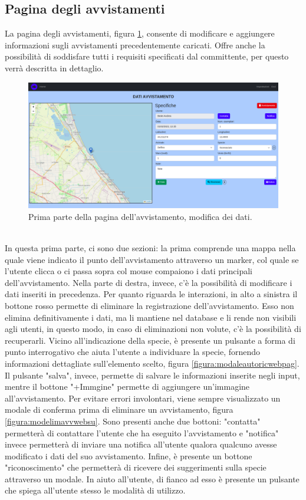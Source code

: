 \documentclass[a4paper,final,12pt]{report}
\begin{document}
\subsection{Pagina degli avvistamenti}
La pagina degli avvistamenti, figura \ref{figura:pagavvstprimaparte}, consente di modificare e aggiungere informazioni sugli avvistamenti precedentemente caricati. Offre anche la possibilità di soddisfare tutti i requisiti specificati dal committente, per questo verrà descritta in dettaglio.
\begin{figure}[hbtp]
\centering
\includegraphics[scale=0.22]{img_concettuale/avvistamentoPAG.png}
\caption{Prima parte della pagina dell'avvistamento, modifica dei dati.}
\label{figura:pagavvstprimaparte}
\end{figure}
\\In questa prima parte, ci sono due sezioni: la prima comprende una mappa nella quale viene indicato il punto dell'avvistamento attraverso un marker, col quale se l'utente clicca o ci passa sopra col mouse compaiono i dati principali dell'avvistamento. Nella parte di destra, invece, c'è la possibilità di modificare i dati inseriti in precedenza.
Per quanto riguarda le interazioni, in alto a sinistra il bottone rosso permette di eliminare la registrazione dell'avvistamento. Esso non elimina definitivamente i dati, ma li mantiene nel database e li rende non visibili agli utenti, in questo modo, in caso di eliminazioni non volute, c'è la possibilità di recuperarli.
Vicino all'indicazione della specie, è presente un pulsante a forma di punto interrogativo che aiuta l'utente a individuare la specie, fornendo informazioni dettagliate sull'elemento scelto, figura \ref{figura:modaleautoricwebpag}.  
Il pulsante "salva", invece, permette di salvare le informazioni inserite negli input, mentre il bottone "+Immgine" permette di aggiungere un'immagine all'avvistamento. Per evitare errori involontari, viene sempre visualizzato un modale di conferma prima di eliminare un avvistamento, figura \ref{figura:modelimavvwebsu}. Sono presenti anche due bottoni: "contatta" permetterà di contattare l'utente che ha eseguito l'avvistamento e "notifica" invece permetterà di inviare una notifica all'utente qualora qualcuno avesse modificato i dati del suo avvistamento. Infine, è presente un bottone "riconoscimento" che permetterà di ricevere dei suggerimenti sulla specie attraverso un modale. In aiuto all'utente, di fianco ad esso è presente un pulsante che spiega all'utente stesso le modalità di utilizzo.
\end{document}
